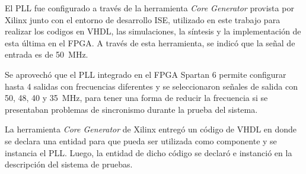 		El PLL fue configurado a través de la herramienta {\it Core Generator} provista por Xilinx junto con el entorno de desarrollo ISE, utilizado en este trabajo para realizar los codigos en VHDL, las simulaciones, la síntesis y la implementación de esta última en el FPGA\cite{XilinxInc}. A través de esta herramienta, se indicó que la señal de entrada es de \SI{50}{\mega\hertz}.
		
		Se aprovechó que el PLL integrado en el FPGA Spartan 6 permite configurar hasta 4 salidas con frecuencias diferentes y se seleccionaron señales de salida con \si{50}, \si{48}, \si{40} y \SI{35}{\mega\hertz}, para tener una forma de reducir la frecuencia si se presentaban problemas de sincronismo durante la prueba del sistema. 
		
		La herramienta {\it Core Generator} de Xilinx entregó un código de VHDL en donde se declara una entidad para que pueda ser utilizada como componente y se instancia el PLL. Luego, la entidad de dicho código se declaró e instanció en la descripción del sistema de pruebas.
		
%		
%	
		
		
%	
		
